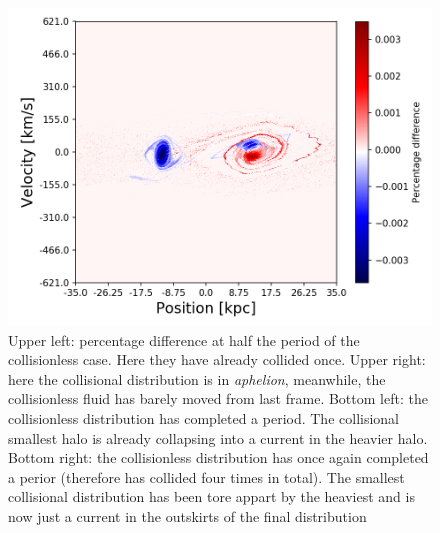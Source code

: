 \begin{figure}[h!]
    \includegraphics[scale=0.45]{imag/diffBullet94.png}
    \caption{Upper left: percentage difference at half the period of the collisionless case. Here they have already collided once. Upper right: here the collisional distribution is in \emph{aphelion}, meanwhile, the collisionless fluid has barely moved from last frame. Bottom left: the collisionless distribution has completed a period. The collisional smallest halo is already collapsing into a current in the heavier halo. Bottom right: the collisionless distribution has once again completed a perior (therefore has collided four times in total). The smallest collisional distribution has been tore appart by the heaviest and is now just a current in the outskirts of the final distribution }
        \label{colBulletPhase}
\end{figure}





\newpage
